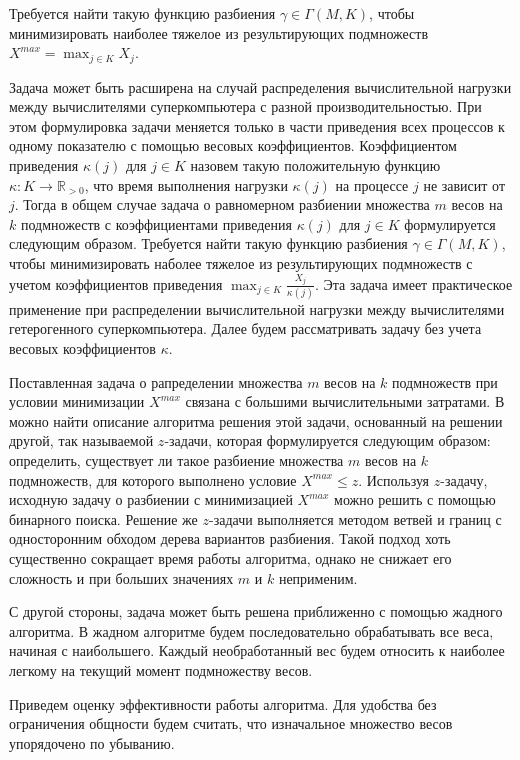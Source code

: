 Требуется найти такую функцию разбиения $\gamma \in \Gamma(M, K)$, чтобы минимизировать наиболее тяжелое из результирующих подмножеств $X^{max} = \max_{j \in K}{X_j}$.

Задача может быть расширена на случай распределения вычислительной нагрузки между вычислителями суперкомпьютера с разной производительностью.
При этом формулировка задачи меняется только в части приведения всех процессов к одному показателю с помощью весовых коэффициентов.
Коэффициентом приведения $\kappa(j)$ для $j \in K$ назовем такую положительную функцию $\kappa: K \rightarrow \mathbb{R}_{>0}$, что время выполнения нагрузки $\kappa(j)$ на процессе $j$ не зависит от $j$.
Тогда в общем случае задача о равномерном разбиении множества $m$ весов на $k$ подмножеств с коэффициентами приведения $\kappa(j)$ для $j \in K$ формулируется следующим образом.
Требуется найти такую функцию разбиения $\gamma \in \Gamma(M, K)$, чтобы минимизировать наболее тяжелое из результирующих подмножеств с учетом коэффициентов приведения $\max_{j \in K}{ \frac{X_j}{\kappa(j)} }$.
Эта задача имеет практическое применение при распределении вычислительной нагрузки между вычислителями гетерогенного суперкомпьютера.
Далее будем рассматривать задачу без учета весовых коэффициентов $\kappa$.

Поставленная задача о рапределении множества $m$ весов на $k$ подмножеств при условии минимизации $X^{max}$ связана с большими вычислительными затратами.
В \cite{Romanovskii1977Extreme} можно найти описание алгоритма решения этой задачи, основанный на решении другой, так называемой $z$-задачи, которая формулируется следующим образом: определить, существует ли такое разбиение множества $m$ весов на $k$ подмножеств, для которого выполнено условие $X^{max} \le z$.
Используя $z$-задачу, исходную задачу о разбиении с минимизацией $X^{max}$ можно решить с помощью бинарного поиска.
Решение же $z$-задачи выполняется методом ветвей и границ с односторонним обходом дерева вариантов разбиения.
Такой подход хоть существенно сокращает время работы алгоритма, однако не снижает его сложность и при больших значениях $m$ и $k$ неприменим.

С другой стороны, задача может быть решена приближенно с помощью жадного алгоритма.
В жадном алгоритме будем последовательно обрабатывать все веса, начиная с наибольшего.
Каждый необработанный вес будем относить к наиболее легкому на текущий момент подмножеству весов.

Приведем оценку эффективности работы алгоритма.
Для удобства без ограничения общности будем считать, что изначальное множество весов упорядочено по убыванию.

